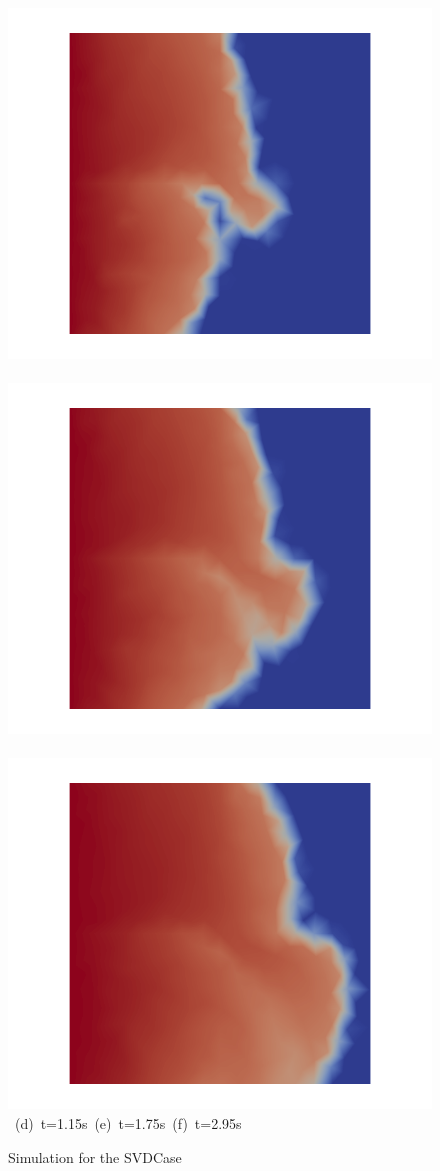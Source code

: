 \begin{landscape}
\begin{figure}[ht]
{\hbox{
      \includegraphics[width=.56\textwidth]{./Pics/SVDCase/SVDCase_Saturation_t_1dot15.png}
      \includegraphics[width=.56\textwidth]{./Pics/SVDCase/SVDCase_Saturation_t_1dot75.png} 
      \includegraphics[width=.56\textwidth]{./Pics/SVDCase/SVDCase_Saturation_t_2dot95.png}}
\vspace{0.cm}
\hbox{ \hspace{2.5cm} (d) t=1.15s \hspace{5.5cm} (e) t=1.75s   \hspace{5.5cm} (f) t=2.95s}
\vspace{0.cm}
}   
\caption{Simulation for the SVDCase}
\label{fig:SVDCase_Saturation}
\end{figure}
\end{landscape}
\clearpage



